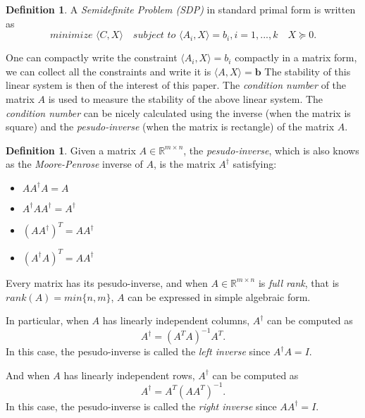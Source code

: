 \documentclass[12pt]{amsart}
\numberwithin{equation}{section}
\theoremstyle{definition}
\newtheorem{definition}[thm]{Definition}
\numberwithin{thm}{section}
\begin{document}
\begin{definition}
     \label{def:SDP}
     A \emph{Semidefinite Problem (SDP)} in standard primal form is written as
     \begin{equation}
          \textit{minimize } \langle C, X \rangle \quad \textit{subject to } \langle A_i, X \rangle = b_i, i=1,...,k \quad X \succcurlyeq 0 \label{eq:2.3}.
     \end{equation}
\end{definition}

\smallskip

One can compactly write the constraint $\langle A_i, X \rangle = b_i$ compactly in a matrix form, we can collect all the constraints and write it is $ \langle A, X \rangle = \mathbf{b}$ 
The stability of this linear system is then of the interest of this paper. 
The \emph{condition number} of the matrix $A$ is used to measure the stability of the above linear system. 
The \emph{condition number} can be nicely calculated using the inverse (when the matrix is square) and the \emph{pesudo-inverse} (when the matrix is rectangle) of the matrix $A$.

\begin{definition}
     Given a matrix $A \in \mathbb{R}^{m \times n}$, the \emph{pesudo-inverse},
     which is also knows as the \emph{Moore-Penrose} inverse of $A$, is the matrix
     $A^\dagger$ satisfying:
     \begin{itemize}
          \item $A A^\dagger A = A$
          \item $A^\dagger A A^\dagger = A^\dagger$
          \item $(A A^\dagger)^T = A A^\dagger$
          \item $(A^\dagger A)^T = A A^\dagger$
        \end{itemize}
\end{definition}

Every matrix has its pesudo-inverse, and when $A \in \mathbb{R}^{m \times n}$ is \emph{full rank}, 
that is $rank(A) = min\{n, m\}$, $A$ can be expressed in simple algebraic form.

In particular, when $A$ has linearly independent columns, $A^\dagger$ can be computed as
\begin{equation*}
     A^\dagger = (A^T A)^{-1} A^T.
\end{equation*}
In this case, the pesudo-inverse is called the \emph{left inverse} since $A^\dagger A = I$.

\smallskip
And when $A$ has linearly independent rows, $A^\dagger$ can be computed as
\begin{equation*}
     A^\dagger = A^T (A A^T)^{-1}.
\end{equation*}
In this case, the pesudo-inverse is called the \emph{right inverse} since $A A^\dagger = I$. 
\end{document}
